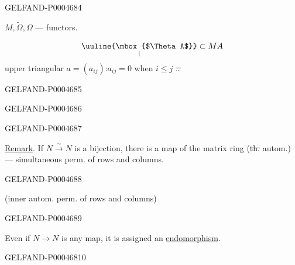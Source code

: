 \begin{GelfandAdjacentEvidence}{GELFAND-P000468}{4}


$M,\widetilde\Omega,\Omega$ — functors.

\[
\underset{\vert}{\text{\uuline{\mbox{$\Theta A$}}}}\subset MA
\]
upper triangular $a=(a_{ij})$:\quad $a_{ij}=0$ when $i\le j$ \sout{\ldots}
\end{GelfandAdjacentEvidence}
\begin{GelfandAdjacentEvidence}{GELFAND-P000468}{5}

\end{GelfandAdjacentEvidence}
\begin{GelfandAdjacentEvidence}{GELFAND-P000468}{6}

\end{GelfandAdjacentEvidence}
\begin{GelfandAdjacentEvidence}{GELFAND-P000468}{7}


\underline{Remark}. If $N\xrightarrow{\sim}N$ is a bijection, there is a map of the matrix ring
(\sout{th.} autom.) — simultaneous perm. of rows and columns.
\end{GelfandAdjacentEvidence}
\begin{GelfandAdjacentEvidence}{GELFAND-P000468}{8}

(inner autom. perm. of rows and columns)
\end{GelfandAdjacentEvidence}
\begin{GelfandAdjacentEvidence}{GELFAND-P000468}{9}


Even if $N\longrightarrow N$ is any map, it is assigned an \underline{endomorphism}.
\end{GelfandAdjacentEvidence}
\begin{GelfandAdjacentEvidence}{GELFAND-P000468}{10}

\end{GelfandAdjacentEvidence}

